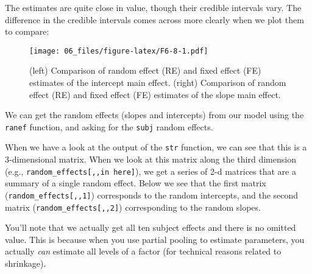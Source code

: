 \documentclass[
]{book}
\newenvironment{Shaded}{\begin{snugshade}}{\end{snugshade}}
\newcommand{\DocumentationTok}[1]{\textcolor[rgb]{0.56,0.35,0.01}{\textbf{\textit{#1}}}}
\newcommand{\FunctionTok}[1]{\textcolor[rgb]{0.00,0.00,0.00}{#1}}
\newcommand{\NormalTok}[1]{#1}
\newcommand{\OtherTok}[1]{\textcolor[rgb]{0.56,0.35,0.01}{#1}}
\newcommand{\SpecialCharTok}[1]{\textcolor[rgb]{0.00,0.00,0.00}{#1}}
\begin{document}
The estimates are quite close in value, though their credible intervals vary. The difference in the credible intervals comes across more clearly when we plot them to compare:

\begin{figure}
\centering
\texttt{[image: 06\_files/figure-latex/F6-8-1.pdf]}
\caption{\label{fig:F6-8}(left) Comparison of random effect (RE) and fixed effect (FE) estimates of the intercept main effect. (right) Comparison of random effect (RE) and fixed effect (FE) estimates of the slope main effect.}
\end{figure}

We can get the random effects (slopes and intercepts) from our model using the \texttt{ranef} function, and asking for the \texttt{subj} random effects.

\begin{Shaded}
\end{Shaded}

When we have a look at the output of the \texttt{str} function, we can see that this is a 3-dimensional matrix. When we look at this matrix along the third dimension (e.g., \texttt{random\_effects{[},,in\ here{]}}), we get a series of 2-d matrices that are a summary of a single random effect. Below we see that the first matrix (\texttt{random\_effects{[},,1{]}}) corresponds to the random intercepts, and the second matrix (\texttt{random\_effects{[},,2{]}}) corresponding to the random slopes.

You'll note that we actually get all ten subject effects and there is no omitted value. This is because when you use partial pooling to estimate parameters, you actually \emph{can} estimate all levels of a factor (for technical reasons related to shrinkage).
\end{document}
